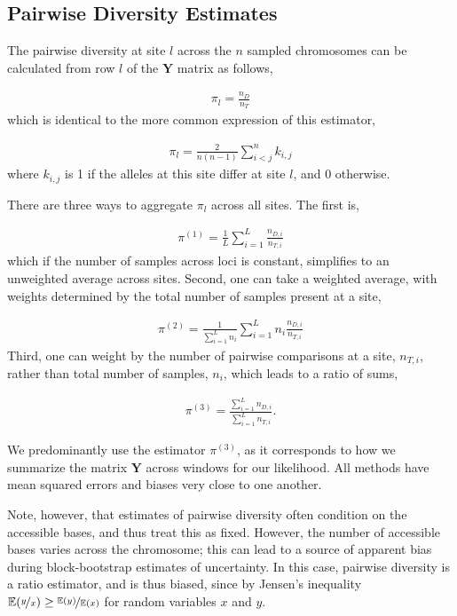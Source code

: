 \documentclass[11pt]{article}
\newcommand{\E}{\mathbb{E}}
\begin{document}
\subsection{Pairwise Diversity Estimates}
\label{supp:diversity}

The pairwise diversity at site $l$ across the $n$ sampled chromosomes can be
calculated from row $l$ of the $\mathbf{Y}$ matrix as follows,

\begin{align}
  \pi_l = \frac{n_D}{n_T}
\end{align}
%
which is identical to the more common expression of this estimator, 

\begin{align}
  \pi_l = \frac{2}{n(n-1)} \sum_{i < j}^n k_{i,j}
\end{align}
%
where $k_{i,j}$ is 1 if the alleles at this site differ at site $l$, and 0
otherwise.

There are three ways to aggregate $\pi_l$ across all sites. The first is,

\begin{align}
  \label{eq:}
  \pi^{(1)} = \frac{1}{L} \sum_{i=1}^L \frac{n_{D,i}}{n_{T,i}}
\end{align}
%
which if the number of samples across loci is constant, simplifies to an
unweighted average across sites. Second, one can take a weighted average, with
weights determined by the total number of samples present at a site,

\begin{align}
  \label{eq:}
  \pi^{(2)} = \frac{1}{\sum_{i=1}^L n_i} \sum_{i=1}^L n_i \frac{n_{D,i}}{n_{T,i}}
\end{align}
%
Third, one can weight by the number of pairwise comparisons at a site,
$n_{T,i}$, rather than total number of samples, $n_i$, which leads to a ratio
of sums,

\begin{align}
  \label{eq:}
  \pi^{(3)} = \frac{\sum_{i=1}^L n_{D,i}}{\sum_{i=1}^L n_{T,i}}.
\end{align}

We predominantly use the estimator $\pi^{(3)}$, as it corresponds to how we
summarize the matrix $\mathbf{Y}$ across windows for our likelihood. All
methods have mean squared errors and biases very close to one another.

Note, however, that estimates of pairwise diversity often condition on the
accessible bases, and thus treat this as fixed. However, the number of
accessible bases varies across the chromosome; this can lead to a source of
apparent bias during block-bootstrap estimates of uncertainty.  In this case,
pairwise diversity is a ratio estimator, and is thus biased, since by Jensen's
inequality $\E(\nicefrac{y}{x}) \ge \nicefrac{\E(y)}{\E(x)}$ for random
variables $x$ and $y$. 
\end{document}

